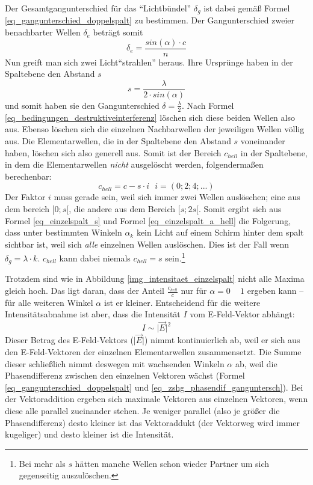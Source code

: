 Der Gesamtgangunterschied für das "`Lichtbündel"' \(\delta_g\) ist dabei gemäß Formel \ref{eq_gangunterschied_doppelspalt} zu bestimmen. Der Gangunterschied zweier benachbarter Wellen \(\delta_e\) beträgt somit 
\begin{equation}
   \delta_e = \frac{sin(\alpha) \cdot c}{n}
\end{equation}
Nun greift man sich zwei Licht"`strahlen"' heraus. Ihre Ursprünge haben in der Spaltebene den Abstand \(s\)
\begin{equation}
   s = \frac{\lambda}{2 \cdot sin(\alpha)}
   \label{eq_einzelspalt_s}
\end{equation}
und somit haben sie den Gangunterschied \(\delta = \frac{\lambda}{2}\). Nach Formel \ref{eq_bedingungen_destruktiveinterferenz} löschen sich diese beiden Wellen also aus. Ebenso löschen sich die einzelnen Nachbarwellen der jeweiligen Wellen völlig aus. Die Elementarwellen, die in der Spaltebene den Abstand \(s\) voneinander haben, löschen sich also generell aus. Somit ist der Bereich \(c_{hell}\) in der Spaltebene, in dem die Elementarwellen \emph{nicht} ausgelöscht werden, folgendermaßen berechenbar:
\begin{equation}
   c_{hell} = c - s \cdot i ~~~ i = (0; 2; 4; ...)
   \label{eq_einzelspalt_a_hell}
\end{equation}
Der Faktor \(i\) muss gerade sein, weil sich immer zwei Wellen auslöschen; eine aus dem bereich \([0;s[\), die andere aus dem Bereich \([s;2s[\). Somit ergibt sich aus Formel \ref{eq_einzelspalt_s} und Formel \ref{eq_einzelspalt_a_hell} die Folgerung, dass unter bestimmten Winkeln \(\alpha_k\) kein Licht auf einem Schirm hinter dem spalt sichtbar ist, weil sich \emph{alle} einzelnen Wellen auslöschen. Dies ist der Fall wenn \(\delta_g = \lambda \cdot k\). \(c_{hell}\) kann dabei niemals \(c_{hell} = s\)  sein.\footnote{Bei mehr als \(s\) hätten manche Wellen schon wieder Partner um sich gegenseitig auszulöschen.}

Trotzdem sind wie in Abbildung \ref{img_intensitaet_einzelspalt} nicht alle Maxima gleich hoch. Das ligt daran, dass der Anteil \(\frac{c_{hell}}{c}\) nur für \(\alpha = 0\) ~ \(1\) ergeben kann -- für alle weiteren Winkel \(\alpha\) ist er kleiner. Entscheidend für die weitere Intensitätsabnahme ist aber, dass die Intensität \(I\) vom E-Feld-Vektor abhängt:
\begin{equation}
   I \sim \vert \vec{E} \vert ^2
   \label{eq_intensitaet}
\end{equation}
Dieser Betrag des E-Feld-Vektors (\(\vert \vec{E} \vert\)) nimmt kontinuierlich ab, weil er sich aus den E-Feld-Vektoren der einzelnen Elementarwellen zusammensetzt. Die Summe dieser schließlich nimmt deswegen mit wachsenden Winkeln \(\alpha\) ab, weil die Phasendifferenz zwischen den einzelnen Vektoren wächst (Formel \ref{eq_gangunterschied_doppelspalt} und \ref{eq_zshg_phasendif_ganguntersch}). Bei der Vektoraddition ergeben sich maximale Vektoren aus einzelnen Vektoren, wenn diese alle parallel zueinander stehen. Je weniger parallel (also je größer die Phasendifferenz) desto kleiner ist das Vektoraddukt (der Vektorweg wird immer kugeliger) und desto kleiner ist die Intensität.






